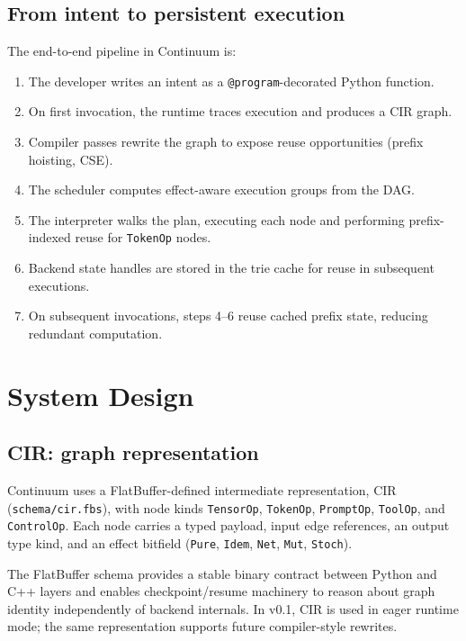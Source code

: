 \documentclass[10pt,twocolumn]{article}
\begin{document}
\subsection{From intent to persistent execution}
The end-to-end pipeline in Continuum is:
\begin{enumerate}[leftmargin=*]
  \item The developer writes an intent as a \texttt{@program}-decorated Python function.
  \item On first invocation, the runtime traces execution and produces a CIR graph.
  \item Compiler passes rewrite the graph to expose reuse opportunities (prefix hoisting, CSE).
  \item The scheduler computes effect-aware execution groups from the DAG.
  \item The interpreter walks the plan, executing each node and performing prefix-indexed reuse for \texttt{TokenOp} nodes.
  \item Backend state handles are stored in the trie cache for reuse in subsequent executions.
  \item On subsequent invocations, steps 4--6 reuse cached prefix state, reducing redundant computation.
\end{enumerate}

\section{System Design}

\subsection{CIR: graph representation}
Continuum uses a FlatBuffer-defined intermediate representation, CIR (\texttt{schema/cir.fbs}), with node kinds \texttt{TensorOp}, \texttt{TokenOp}, \texttt{PromptOp}, \texttt{ToolOp}, and \texttt{ControlOp}. Each node carries a typed payload, input edge references, an output type kind, and an effect bitfield (\texttt{Pure}, \texttt{Idem}, \texttt{Net}, \texttt{Mut}, \texttt{Stoch}).

The FlatBuffer schema provides a stable binary contract between Python and C++ layers and enables checkpoint/resume machinery to reason about graph identity independently of backend internals. In v0.1, CIR is used in eager runtime mode; the same representation supports future compiler-style rewrites.
\end{document}
